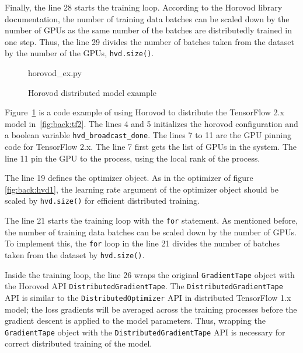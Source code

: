 Finally, the line 28 starts the training loop.
According to the Horovod library documentation, the number of training data
batches can be scaled down by the number of GPUs as the same number of
the batches are distributedly trained in one step.
Thus, the line 29 divides the number of batches taken from the dataset
by the number of the GPUs, {\tt hvd.size()}.


\begin{figure}[ht!]
 
{horovod_ex.py}
  \caption{Horovod distributed model example}
\label{fig:back:hvd2} 
\end{figure}

Figure~\ref{fig:back:hvd2} is a code example of using Horovod to distribute
the TensorFlow 2.x model in~\ref{fig:back:tf2}.
The lines 4 and 5 initializes the horovod configuration and a boolean variable
{\tt hvd\_broadcast\_done}.
The lines 7 to 11 are the GPU pinning code for TensorFlow 2.x. 
The line 7 first gets the list of GPUs in the system.
The line 11 pin the GPU to the process, using the local rank of the process.

The line 19 defines the optimizer object.
As in the optimizer of figure \ref{fig:back:hvd1}, 
the learning rate argument of the optimizer object 
should be scaled by {\tt hvd.size()} for efficient distributed training. 

The line 21 starts the training loop with the {\tt for} statement.
As mentioned before, the number of training data batches can be
scaled down by the number of GPUs.
To implement this, the {\tt for} loop in the line 21
divides the number of batches taken from the dataset by {\tt hvd.size()}.

Inside the training loop,
the line 26 wraps the original {\tt GradientTape} object with the Horovod API  
{\tt DistributedGradientTape}.
The {\tt DistributedGradientTape} API is similar
to the {\tt DistributedOptimizer} API in distributed TensorFlow 1.x model; 
the loss gradients will be averaged across the training processes 
before the gradient descent is applied to the model parameters.
Thus, wrapping the {\tt GradientTape} object with the 
{\tt DistributedGradientTape} API is necessary for correct distributed training
of the model.

